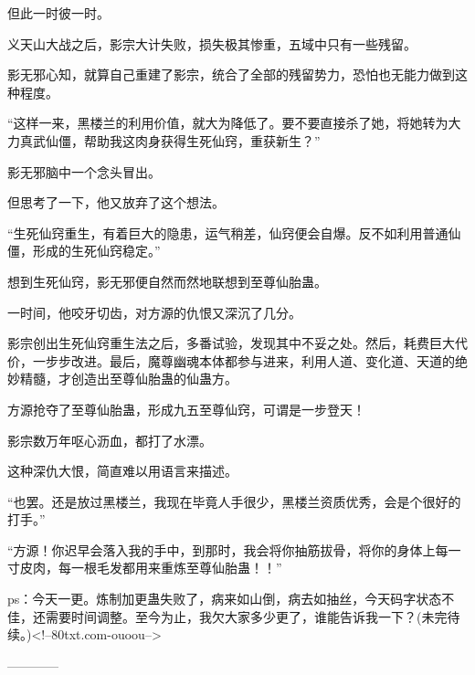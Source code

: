 \begin{this_body}
但此一时彼一时。

义天山大战之后，影宗大计失败，损失极其惨重，五域中只有一些残留。

影无邪心知，就算自己重建了影宗，统合了全部的残留势力，恐怕也无能力做到这种程度。

“这样一来，黑楼兰的利用价值，就大为降低了。要不要直接杀了她，将她转为大力真武仙僵，帮助我这肉身获得生死仙窍，重获新生？”

影无邪脑中一个念头冒出。

但思考了一下，他又放弃了这个想法。

“生死仙窍重生，有着巨大的隐患，运气稍差，仙窍便会自爆。反不如利用普通仙僵，形成的生死仙窍稳定。”

想到生死仙窍，影无邪便自然而然地联想到至尊仙胎蛊。

一时间，他咬牙切齿，对方源的仇恨又深沉了几分。

影宗创出生死仙窍重生法之后，多番试验，发现其中不妥之处。然后，耗费巨大代价，一步步改进。最后，魔尊幽魂本体都参与进来，利用人道、变化道、天道的绝妙精髓，才创造出至尊仙胎蛊的仙蛊方。

方源抢夺了至尊仙胎蛊，形成九五至尊仙窍，可谓是一步登天！

影宗数万年呕心沥血，都打了水漂。

这种深仇大恨，简直难以用语言来描述。

“也罢。还是放过黑楼兰，我现在毕竟人手很少，黑楼兰资质优秀，会是个很好的打手。”

“方源！你迟早会落入我的手中，到那时，我会将你抽筋拔骨，将你的身体上每一寸皮肉，每一根毛发都用来重炼至尊仙胎蛊！！”

ps：今天一更。炼制加更蛊失败了，病来如山倒，病去如抽丝，今天码字状态不佳，还需要时间调整。至今为止，我欠大家多少更了，谁能告诉我一下？(未完待续。)<!--80txt.com-ouoou-->

------------

\end{this_body}


